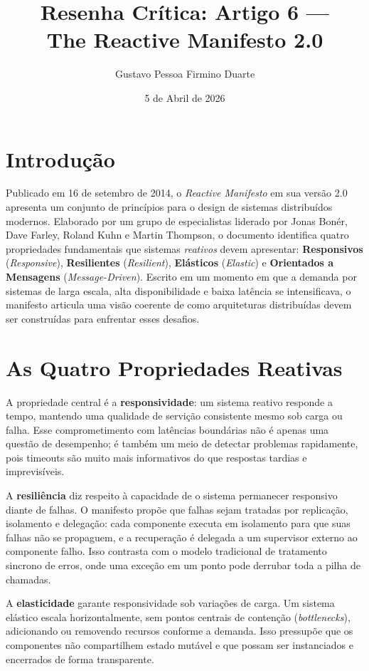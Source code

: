 \documentclass[12pt,a4paper]{article}
\title{Resenha Cr\'itica: Artigo 6 ---\\
The Reactive Manifesto 2.0}
\author{Gustavo Pessoa Firmino Duarte}
\date{5 de Abril de 2026}
\begin{document}
\maketitle

\section{Introdu\c{c}\~ao}

Publicado em 16 de setembro de 2014, o \textit{Reactive Manifesto} em sua vers\~ao
2.0 apresenta um conjunto de princ\'ipios para o design de sistemas distribu\'idos
modernos. Elaborado por um grupo de especialistas liderado por Jonas Bon\'er, Dave
Farley, Roland Kuhn e Martin Thompson, o documento identifica quatro propriedades
fundamentais que sistemas \textit{reativos} devem apresentar: \textbf{Responsivos}
(\textit{Responsive}), \textbf{Resilientes} (\textit{Resilient}),
\textbf{El\'asticos} (\textit{Elastic}) e \textbf{Orientados a Mensagens}
(\textit{Message-Driven}). Escrito em um momento em que a demanda por sistemas de
larga escala, alta disponibilidade e baixa lat\^encia se intensificava, o manifesto
articula uma vis\~ao coerente de como arquiteturas distribu\'idas devem ser
constru\'idas para enfrentar esses desafios.

\section{As Quatro Propriedades Reativas}

A propriedade central \'e a \textbf{responsividade}: um sistema reativo responde
a tempo, mantendo uma qualidade de servi\c{c}\~ao consistente mesmo sob carga ou
falha. Esse comprometimento com lat\^encias bound\'arias n\~ao \'e apenas uma
quest\~ao de desempenho; \'e tamb\'em um meio de detectar problemas rapidamente,
pois timeouts s\~ao muito mais informativos do que respostas tardias e
imprevis\'iveis.

A \textbf{resili\^encia} diz respeito \`a capacidade de o sistema permanecer
responsivo diante de falhas. O manifesto prop\~oe que falhas sejam tratadas por
replica\c{c}\~ao, isolamento e delega\c{c}\~ao: cada componente executa em
isolamento para que suas falhas n\~ao se propaguem, e a recupera\c{c}\~ao \'e
delegada a um supervisor externo ao componente falho. Isso contrasta com o modelo
tradicional de tratamento sincrono de erros, onde uma exce\c{c}\~ao em um ponto
pode derrubar toda a pilha de chamadas.

A \textbf{elasticidade} garante responsividade sob varia\c{c}\~oes de carga. Um
sistema el\'astico escala horizontalmente, sem pontos centrais de contenção
(\textit{bottlenecks}), adicionando ou removendo recursos conforme a demanda.
Isso pressup\~oe que os componentes n\~ao compartilhem estado mut\'avel e que
possam ser instanciados e encerrados de forma transparente.
\end{document}
